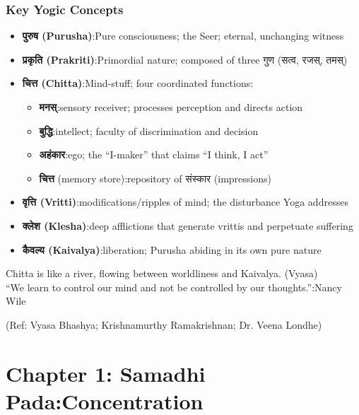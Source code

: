 \begin{frame}[fragile]\frametitle{Key Yogic Concepts}
\begin{itemize}
\item \textbf{पुरुष (Purusha)}:Pure consciousness; the Seer; eternal, unchanging witness
\item \textbf{प्रकृति (Prakriti)}:Primordial nature; composed of three गुण (सत्व, रजस्, तमस्)
\item \textbf{चित्त (Chitta)}:Mind-stuff; four coordinated functions:
    \begin{itemize}
    \item \textbf{मनस्}:sensory receiver; processes perception and directs action
    \item \textbf{बुद्धि}:intellect; faculty of discrimination and decision
    \item \textbf{अहंकार}:ego; the ``I-maker'' that claims ``I think, I act''
    \item \textbf{चित्त} (memory store):repository of संस्कार (impressions)
    \end{itemize}
\item \textbf{वृत्ति (Vritti)}:modifications/ripples of mind; the disturbance Yoga addresses
\item \textbf{क्लेश (Klesha)}:deep afflictions that generate vrittis and perpetuate suffering
\item \textbf{कैवल्य (Kaivalya)}:liberation; Purusha abiding in its own pure nature
\end{itemize}

\vspace{2mm}
\begin{center}
{\small Chitta is like a river, flowing between worldliness and Kaivalya. (Vyasa)\\
``We learn to control our mind and not be controlled by our thoughts.'':Nancy Wile}
\end{center}

\tiny{(Ref: Vyasa Bhashya; Krishnamurthy Ramakrishnan; Dr. Veena Londhe)}

\end{frame}

\section[Samadhipad]{Chapter 1: Samadhi Pada:Concentration}

